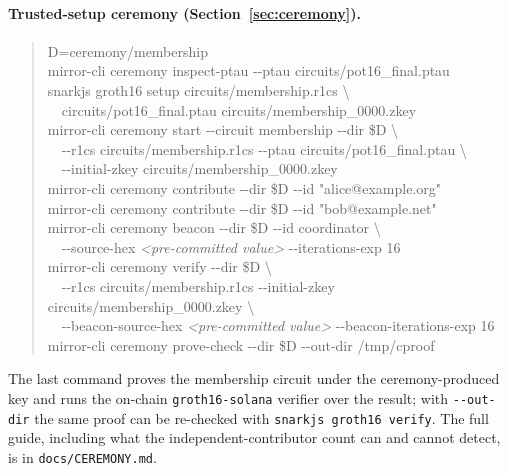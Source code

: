 \documentclass[10pt]{article}
\newcommand{\code}[1]{\texttt{#1}}
\begin{document}
\paragraph{Trusted-setup ceremony (Section~\ref{sec:ceremony}).}
\begin{quote}\footnotesize\ttfamily
D=ceremony/membership\\
mirror-cli ceremony inspect-ptau -{}-ptau circuits/pot16\_final.ptau\\
snarkjs groth16 setup circuits/membership.r1cs \textbackslash\\
\ \ circuits/pot16\_final.ptau circuits/membership\_0000.zkey\\
mirror-cli ceremony start -{}-circuit membership -{}-dir \$D \textbackslash\\
\ \ -{}-r1cs circuits/membership.r1cs -{}-ptau circuits/pot16\_final.ptau \textbackslash\\
\ \ -{}-initial-zkey circuits/membership\_0000.zkey\\
mirror-cli ceremony contribute -{}-dir \$D -{}-id "alice@example.org"\\
mirror-cli ceremony contribute -{}-dir \$D -{}-id "bob@example.net"\\
mirror-cli ceremony beacon -{}-dir \$D -{}-id coordinator \textbackslash\\
\ \ -{}-source-hex \emph{<pre-committed value>} -{}-iterations-exp 16\\
mirror-cli ceremony verify -{}-dir \$D \textbackslash\\
\ \ -{}-r1cs circuits/membership.r1cs -{}-initial-zkey circuits/membership\_0000.zkey \textbackslash\\
\ \ -{}-beacon-source-hex \emph{<pre-committed value>} -{}-beacon-iterations-exp 16\\
mirror-cli ceremony prove-check -{}-dir \$D -{}-out-dir /tmp/cproof
\end{quote}
The last command proves the membership circuit under the ceremony-produced key and
runs the on-chain \code{groth16-solana} verifier over the result; with
\code{-{}-out-dir} the same proof can be re-checked with \code{snarkjs groth16
verify}. The full guide, including what the independent-contributor count can and
cannot detect, is in \code{docs/CEREMONY.md}.
\end{document}

